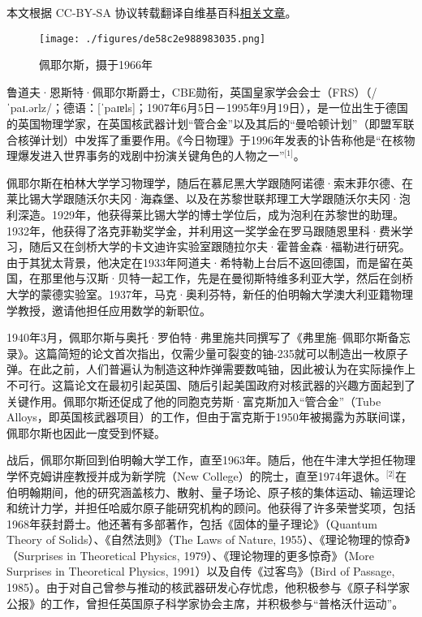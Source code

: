 
本文根据 CC-BY-SA 协议转载翻译自维基百科\href{https://en.wikipedia.org/wiki/Rudolf_Peierls}{相关文章}。

\begin{figure}[ht]
\centering
\texttt{[image: ./figures/de58c2e988983035.png]}
\caption{佩耶尔斯，摄于1966年} \label{fig_LDF_1}
\end{figure}
鲁道夫·恩斯特·佩耶尔斯爵士，CBE勋衔，英国皇家学会会士（FRS）（/ˈpaɪ.ərlz/；德语：[ˈpaɪɐls]；1907年6月5日－1995年9月19日），是一位出生于德国的英国物理学家，在英国核武器计划“管合金”以及其后的“曼哈顿计划”（即盟军联合核弹计划）中发挥了重要作用。《今日物理》于1996年发表的讣告称他是“在核物理爆发进入世界事务的戏剧中扮演关键角色的人物之一”\(^\text{[1]}\)。

佩耶尔斯在柏林大学学习物理学，随后在慕尼黑大学跟随阿诺德·索末菲尔德、在莱比锡大学跟随沃尔夫冈·海森堡、以及在苏黎世联邦理工大学跟随沃尔夫冈·泡利深造。1929年，他获得莱比锡大学的博士学位后，成为泡利在苏黎世的助理。1932年，他获得了洛克菲勒奖学金，并利用这一奖学金在罗马跟随恩里科·费米学习，随后又在剑桥大学的卡文迪许实验室跟随拉尔夫·霍普金森·福勒进行研究。由于其犹太背景，他决定在1933年阿道夫·希特勒上台后不返回德国，而是留在英国，在那里他与汉斯·贝特一起工作，先是在曼彻斯特维多利亚大学，然后在剑桥大学的蒙德实验室。1937年，马克·奥利芬特，新任的伯明翰大学澳大利亚籍物理学教授，邀请他担任应用数学的新职位。

1940年3月，佩耶尔斯与奥托·罗伯特·弗里施共同撰写了《弗里施–佩耶尔斯备忘录》。这篇简短的论文首次指出，仅需少量可裂变的铀-235就可以制造出一枚原子弹。在此之前，人们普遍认为制造这种炸弹需要数吨铀，因此被认为在实际操作上不可行。这篇论文在最初引起英国、随后引起美国政府对核武器的兴趣方面起到了关键作用。佩耶尔斯还促成了他的同胞克劳斯·富克斯加入“管合金”（Tube Alloys，即英国核武器项目）的工作，但由于富克斯于1950年被揭露为苏联间谍，佩耶尔斯也因此一度受到怀疑。

战后，佩耶尔斯回到伯明翰大学工作，直至1963年。随后，他在牛津大学担任物理学怀克姆讲座教授并成为新学院（New College）的院士，直至1974年退休。\(^\text{[2]}\)在伯明翰期间，他的研究涵盖核力、散射、量子场论、原子核的集体运动、输运理论和统计力学，并担任哈威尔原子能研究机构的顾问。他获得了许多荣誉奖项，包括1968年获封爵士。他还著有多部著作，包括《固体的量子理论》（Quantum Theory of Solids）、《自然法则》（The Laws of Nature, 1955）、《理论物理的惊奇》（Surprises in Theoretical Physics, 1979）、《理论物理的更多惊奇》（More Surprises in Theoretical Physics, 1991）以及自传《过客鸟》（Bird of Passage, 1985）。由于对自己曾参与推动的核武器研发心存忧虑，他积极参与《原子科学家公报》的工作，曾担任英国原子科学家协会主席，并积极参与“普格沃什运动”。
